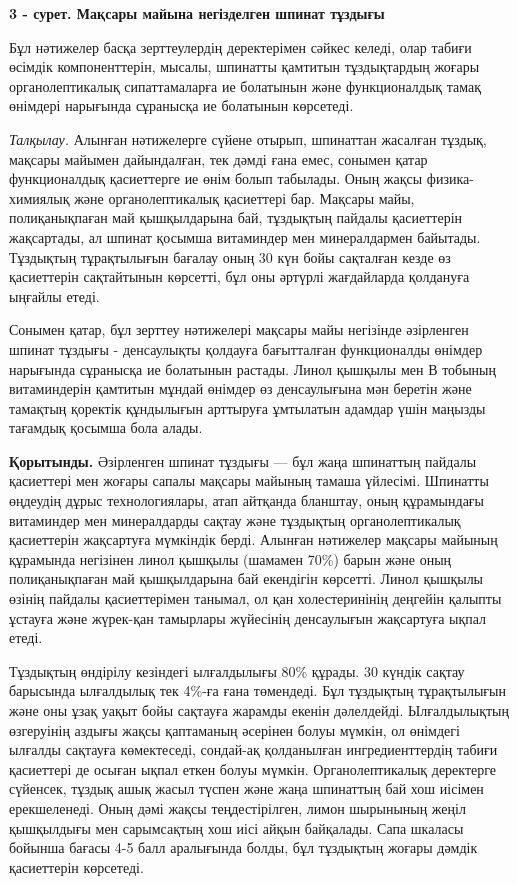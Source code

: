 {{\bfseries 3 - сурет. Мақсары майына негізделген шпинат тұздығы}

Бұл нәтижелер басқа зерттеулердің деректерімен сәйкес келеді, олар
табиғи өсімдік компоненттерін, мысалы, шпинатты қамтитын тұздықтардың
жоғары органолептикалық сипаттамаларға ие болатынын және функционалдық
тамақ өнімдері нарығында сұранысқа ие болатынын көрсетеді.

\emph{Талқылау.} Алынған нәтижелерге сүйене отырып, шпинаттан жасалған
тұздық, мақсары майымен дайындалған, тек дәмді ғана емес, сонымен қатар
функционалдық қасиеттерге ие өнім болып табылады. Оның жақсы
физика-химиялық және органолептикалық қасиеттері бар. Мақсары майы,
полиқанықпаған май қышқылдарына бай, тұздықтың пайдалы қасиеттерін
жақсартады, ал шпинат қосымша витаминдер мен минералдармен байытады.
Тұздықтың тұрақтылығын бағалау оның 30 күн бойы сақталған кезде өз
қасиеттерін сақтайтынын көрсетті, бұл оны әртүрлі жағдайларда қолдануға
ыңғайлы етеді.

Сонымен қатар, бұл зерттеу нәтижелері мақсары майы негізінде әзірленген
шпинат тұздығы - денсаулықты қолдауға бағытталған функционалды өнімдер
нарығында сұранысқа ие болатынын растады. Линол қышқылы мен В тобының
витаминдерін қамтитын мұндай өнімдер өз денсаулығына мән беретін және
тамақтың қоректік құндылығын арттыруға ұмтылатын адамдар үшін маңызды
тағамдық қосымша бола алады.

{\bfseries Қорытынды.} Әзірленген шпинат тұздығы --- бұл жаңа шпинаттың
пайдалы қасиеттері мен жоғары сапалы мақсары майының тамаша үйлесімі.
Шпинатты өңдеудің дұрыс технологиялары, атап айтқанда бланштау, оның
құрамындағы витаминдер мен минералдарды сақтау және тұздықтың
органолептикалық қасиеттерін жақсартуға мүмкіндік берді. Алынған
нәтижелер мақсары майының құрамында негізінен линол қышқылы (шамамен
70\%) барын және оның полиқанықпаған май қышқылдарына бай екендігін
көрсетті. Линол қышқылы өзінің пайдалы қасиеттерімен танымал, ол қан
холестеринінің деңгейін қалыпты ұстауға және жүрек-қан тамырлары
жүйесінің денсаулығын жақсартуға ықпал етеді.

Тұздықтың өндірілу кезіндегі ылғалдылығы 80\% құрады. 30 күндік сақтау
барысында ылғалдылық тек 4\%-ға ғана төмендеді. Бұл тұздықтың
тұрақтылығын және оны ұзақ уақыт бойы сақтауға жарамды екенін
дәлелдейді. Ылғалдылықтың өзгеруінің аздығы жақсы қаптаманың әсерінен
болуы мүмкін, ол өнімдегі ылғалды сақтауға көмектеседі, сондай-ақ
қолданылған ингредиенттердің табиғи қасиеттері де осыған ықпал еткен
болуы мүмкін. Органолептикалық деректерге сүйенсек, тұздық ашық жасыл
түспен және жаңа шпинаттың бай хош иісімен ерекшеленеді. Оның дәмі жақсы
теңдестірілген, лимон шырынының жеңіл қышқылдығы мен сарымсақтың хош
иісі айқын байқалады. Сапа шкаласы бойынша бағасы 4-5 балл аралығында
болды, бұл тұздықтың жоғары дәмдік қасиеттерін көрсетеді.

}

